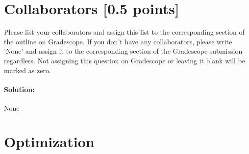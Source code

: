 \documentclass[11pt,english]{article}
\begin{document}
\section{Collaborators [0.5 points]}

Please list your collaborators and assign this list to the corresponding section of the outline on Gradescope. If you don't have any collaborators, please write 'None' and assign it to the corresponding section of the Gradescope submission regardless. Not assigning this question on Gradescope or leaving it blank will be marked as zero.

\paragraph{Solution:}
None

\newpage

\section{Optimization}
\end{document}
